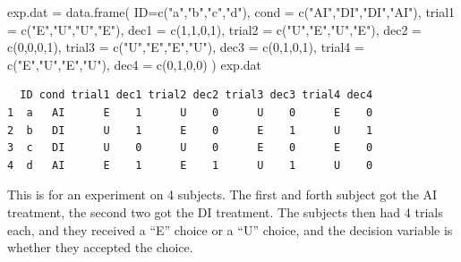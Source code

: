 \documentclass[
  letterpaper,
  DIV=11,
  numbers=noendperiod]{scrreprt}
\newenvironment{Shaded}{\begin{snugshade}}{\end{snugshade}}
\newcommand{\AttributeTok}[1]{\textcolor[rgb]{0.49,0.56,0.16}{#1}}
\newcommand{\DecValTok}[1]{\textcolor[rgb]{0.25,0.63,0.44}{#1}}
\newcommand{\FunctionTok}[1]{\textcolor[rgb]{0.02,0.16,0.49}{#1}}
\newcommand{\NormalTok}[1]{\textcolor[rgb]{0.00,0.44,0.13}{#1}}
\newcommand{\OtherTok}[1]{\textcolor[rgb]{0.00,0.44,0.13}{#1}}
\newcommand{\StringTok}[1]{\textcolor[rgb]{0.25,0.44,0.63}{#1}}
\begin{document}
\begin{Shaded}
\begin{Highlighting}[]
\NormalTok{exp.dat }\OtherTok{=} \FunctionTok{data.frame}\NormalTok{( }\AttributeTok{ID=}\FunctionTok{c}\NormalTok{(}\StringTok{"a"}\NormalTok{,}\StringTok{"b"}\NormalTok{,}\StringTok{"c"}\NormalTok{,}\StringTok{"d"}\NormalTok{), }
      \AttributeTok{cond =} \FunctionTok{c}\NormalTok{(}\StringTok{"AI"}\NormalTok{,}\StringTok{"DI"}\NormalTok{,}\StringTok{"DI"}\NormalTok{,}\StringTok{"AI"}\NormalTok{),}
            \AttributeTok{trial1 =} \FunctionTok{c}\NormalTok{(}\StringTok{"E"}\NormalTok{,}\StringTok{"U"}\NormalTok{,}\StringTok{"U"}\NormalTok{,}\StringTok{"E"}\NormalTok{),}
            \AttributeTok{dec1 =} \FunctionTok{c}\NormalTok{(}\DecValTok{1}\NormalTok{,}\DecValTok{1}\NormalTok{,}\DecValTok{0}\NormalTok{,}\DecValTok{1}\NormalTok{),}
            \AttributeTok{trial2 =} \FunctionTok{c}\NormalTok{(}\StringTok{"U"}\NormalTok{,}\StringTok{"E"}\NormalTok{,}\StringTok{"U"}\NormalTok{,}\StringTok{"E"}\NormalTok{),}
            \AttributeTok{dec2 =} \FunctionTok{c}\NormalTok{(}\DecValTok{0}\NormalTok{,}\DecValTok{0}\NormalTok{,}\DecValTok{0}\NormalTok{,}\DecValTok{1}\NormalTok{),}
                \AttributeTok{trial3 =} \FunctionTok{c}\NormalTok{(}\StringTok{"U"}\NormalTok{,}\StringTok{"E"}\NormalTok{,}\StringTok{"E"}\NormalTok{,}\StringTok{"U"}\NormalTok{),}
            \AttributeTok{dec3 =} \FunctionTok{c}\NormalTok{(}\DecValTok{0}\NormalTok{,}\DecValTok{1}\NormalTok{,}\DecValTok{0}\NormalTok{,}\DecValTok{1}\NormalTok{),}
                \AttributeTok{trial4 =} \FunctionTok{c}\NormalTok{(}\StringTok{"E"}\NormalTok{,}\StringTok{"U"}\NormalTok{,}\StringTok{"E"}\NormalTok{,}\StringTok{"U"}\NormalTok{),}
            \AttributeTok{dec4 =} \FunctionTok{c}\NormalTok{(}\DecValTok{0}\NormalTok{,}\DecValTok{1}\NormalTok{,}\DecValTok{0}\NormalTok{,}\DecValTok{0}\NormalTok{) )}
\NormalTok{exp.dat  }
\end{Highlighting}
\end{Shaded}

\begin{verbatim}
  ID cond trial1 dec1 trial2 dec2 trial3 dec3 trial4 dec4
1  a   AI      E    1      U    0      U    0      E    0
2  b   DI      U    1      E    0      E    1      U    1
3  c   DI      U    0      U    0      E    0      E    0
4  d   AI      E    1      E    1      U    1      U    0
\end{verbatim}

This is for an experiment on 4 subjects. The first and forth subject got
the AI treatment, the second two got the DI treatment. The subjects then
had 4 trials each, and they received a ``E'' choice or a ``U'' choice,
and the decision variable is whether they accepted the choice.
\end{document}

